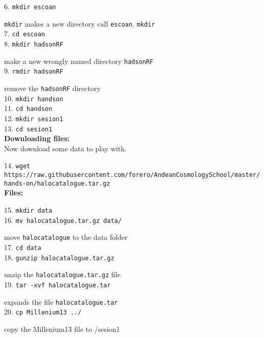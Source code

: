 \documentclass[12pt]{article}
\begin{document}
6. \verb+mkdir escoan+

{\color{blue}} \verb+mkdir+ makes a new directory call \verb+escoan+.
\verb+mkdir+\\

7. \verb+cd escoan+\\

8. \verb+mkdir hadsonRF+

{\color{blue} make a new wrongly named directory \verb+hadsonRF+ }\\

9. \verb+rmdir hadsonRF+

{\color{blue} remove the \verb+hadsonRF+ directory}\\

10. \verb+mkdir handson+\\

11. \verb+cd handson+\\

12. \verb+mkdir sesion1+\\

13. \verb+cd sesion1+\\

\textbf{Downloading files:}\\

Now download some data to play with.

14. {\scriptsize{\verb+wget https://raw.githubusercontent.com/forero/AndeanCosmologySchool/master/hands-on/halocatalogue.tar.gz+}} \\

\textbf{Files:}

15. \verb+mkdir data+\\

16. \verb+mv halocatalogue.tar.gz data/+ 

{\color{blue} move \verb+halocatalogue+ to the data folder}\\

17. \verb+cd data+ \\

18. \verb+gunzip halocatalogue.tar.gz+ 

{\color{blue} unzip the \verb+halocatalogue.tar.gz+ file }\\

19. \verb+tar -xvf halocatalogue.tar+ 

{\color{blue} expands the file \verb+halocatalogue.tar+}\\

20. \verb+cp Millenium13 ../+ 

{\color{blue} copy the Millenium13 file to /sesion1}\\
\end{document}
